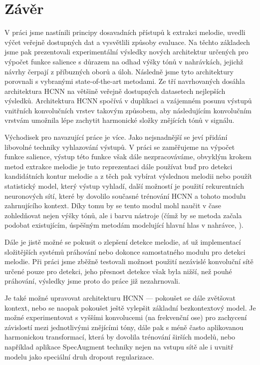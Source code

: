 \chapter*{Závěr}

V práci jsme nastínili principy dosavadních přístupů k extrakci melodie, uvedli výčet veřejně dostupných dat a vysvětlili způsoby evaluace. Na těchto základech jsme pak prezentovali experimentální výsledky nových architektur určených pro výpočet funkce salience s důrazem na odhad výšky tónů v nahrávkách, jejichž návrhy čerpají z příbuzných oborů a úloh. Následně jsme tyto architektury porovnali s vybranými state-of-the-art metodami. Ze tří navrhovaných dosáhla architektura HCNN na většině veřejně dostupných datasetech nejlepších výsledků. Architektura HCNN spočívá v duplikaci a vzájemném posunu výstupů vnitřních konvolučních vrstev takovým způsobem, aby následujícím konvolučním vrstvám umožnila lépe zachytit harmonické složky znějících tónů v signálu.

Východisek pro navazující práce je více. Jako nejsnadnější se jeví přidání libovolné techniky vyhlazování výstupů. V práci se zaměřujeme na výpočet funkce salience, výstup této funkce však dále nezpracováváme, obvyklým krokem metod extrakce melodie je tuto reprezentaci dále používat buď pro detekci kandidátních kontur melodie a z těch pak vybírat výslednou melodii nebo použít statistický model, který výstup vyhladí, další možností je použití rekurentních neuronových sítí, které by dovolilo současné trénování HCNN a tohoto modulu zahrnujícího kontext. Díky tomu by se tento modul mohl naučit v čase zohledňovat nejen výšky tónů, ale i barvu nástroje (čímž by se metoda začala podobat existujícím, úspěšným metodám modelující hlavní hlas v nahrávce, \cite{Durrieu2011a}). 

Dále je jistě možné se pokusit o zlepšení detekce melodie, ať už implementací složitějších systémů práhování nebo dokonce samostatného modulu pro detekci melodie. Při práci jsme zběžně testovali možnost použití nezávislé konvoluční sítě určené pouze pro detekci, jeho přesnost detekce však byla nižší, než pouhé práhování, výsledky jsme proto do práce již nezahrnovali. 

Je také možné upravovat architekturu HCNN --- pokoušet se dále zvětšovat kontext, nebo se naopak pokoušet ještě vylepšit základní bezkontextový model. Je možné experimentovat s vyššími konvolucemi (na frekvenční ose) pro zachycení závislostí mezi jednotlivými znějícími tóny, dále pak s méně často aplikovanou harmonickou transformací, která by dovolila trénování širších modelů, nebo například aplikace SpecAugment techniky nejen na vstupu sítě ale i uvnitř modelu jako speciální druh dropout regularizace. 

